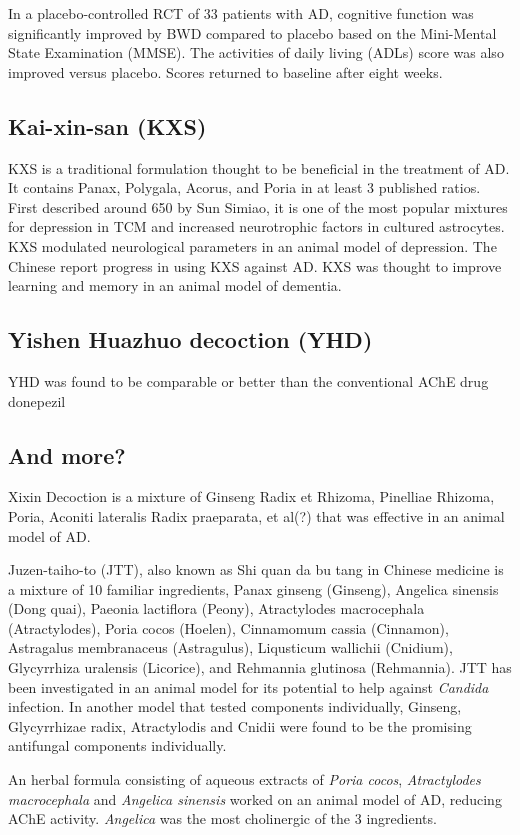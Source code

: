 In a placebo-controlled RCT of 33 patients with AD,
cognitive function was significantly improved by BWD compared to placebo
based on the Mini-Mental State Examination (MMSE).
The activities of daily living (ADLs) score was also improved
versus placebo.
Scores returned to baseline after eight weeks.
\cite{iwasaki2004randomized}




\subsection{Kai-xin-san (KXS)}
KXS is a traditional formulation thought to be beneficial in the treatment
of AD.
It contains
Panax,
Polygala,
Acorus,
and Poria in at least 3 published ratios.
First described around 650 by Sun Simiao,
it is one of the most popular mixtures for depression in TCM
and increased neurotrophic factors in cultured astrocytes.
\cite{zhu2013kai}
KXS modulated neurological parameters in an animal model of depression.
\cite{zhu2012standardized}
The Chinese report progress in using KXS against AD.
\cite{wen2013research}
KXS was thought to improve learning and memory in an animal model of dementia.
\cite{li2009effects}






\subsection{Yishen Huazhuo decoction (YHD)}
YHD was found to be comparable or better than
the conventional AChE drug donepezil

\cite{zhang2015cognitive}


\subsection{And more?}


Xixin Decoction is a mixture of
Ginseng Radix et Rhizoma,
Pinelliae Rhizoma,
Poria,
Aconiti lateralis Radix praeparata,
et al(?)
that was effective in an animal model of AD.
\cite{diwu2013effect}



Juzen-taiho-to (JTT), also known as
Shi quan da bu tang in Chinese medicine
is a mixture of 10 familiar ingredients,
Panax ginseng (Ginseng),
Angelica sinensis (Dong quai),
Paeonia lactiflora (Peony),
Atractylodes macrocephala (Atractylodes),
Poria cocos (Hoelen),
Cinnamomum cassia (Cinnamon),
Astragalus membranaceus (Astragulus),
Liqusticum wallichii (Cnidium),
Glycyrrhiza uralensis (Licorice),
and Rehmannia glutinosa (Rehmannia).
JTT has been investigated in an animal model
for its potential to help against \textit{Candida}
infection.
\cite{akagawa1996protection}
In another model that tested components individually,
Ginseng, Glycyrrhizae radix, Atractylodis and Cnidii
were found to be the promising antifungal components individually.
\cite{abe1998protective}



An herbal formula consisting
of aqueous extracts of
\textit{Poria cocos}, \textit{Atractylodes macrocephala}
and \textit{Angelica sinensis} worked on
an animal model of AD, reducing AChE activity.
\textit{Angelica} was the most cholinergic of the 3 ingredients.
\cite{lin2009aqueous}


